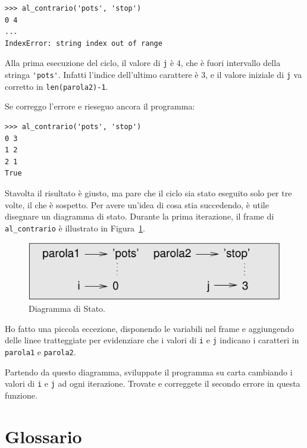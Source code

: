 \documentclass[10pt]{book}
\begin{document}
\begin{verbatim}
>>> al_contrario('pots', 'stop')
0 4
...
IndexError: string index out of range
\end{verbatim}
%
Alla prima esecuzione del ciclo, il valore di {\tt j} è 4,
che è fuori intervallo della stringa \verb"'pots'".
Infatti l'indice dell'ultimo carattere è 3, e il valore iniziale di {\tt j} va corretto in {\tt len(parola2)-1}.

Se correggo l'errore e rieseguo ancora il programma:

\begin{verbatim}
>>> al_contrario('pots', 'stop')
0 3
1 2
2 1
True
\end{verbatim}
%
Stavolta il risultato è giusto, ma pare che il ciclo sia stato eseguito solo per tre volte, il che è sospetto. Per avere un'idea di cosa stia succedendo, è utile disegnare un diagramma di stato. Durante la prima iterazione, il frame di \verb"al_contrario" è illustrato in Figura~\ref{fig.state4}.

\begin{figure}
\centerline
{\includegraphics[scale=0.8]{figs/state4.pdf}}
\caption{Diagramma di Stato.}
\label{fig.state4}
\end{figure}


Ho fatto una piccola eccezione, disponendo le variabili nel frame e aggiungendo delle linee tratteggiate per evidenziare che i valori di {\tt i} e
{\tt j} indicano i caratteri in {\tt parola1} e {\tt parola2}.

\vspace{0.2in}
\begin{exercise}
\label{isreverse}

Partendo da questo diagramma, sviluppate il programma su carta cambiando i valori di {\tt i} e {\tt j} ad ogni iterazione. Trovate e correggete il secondo errore in questa funzione.

\end{exercise}



\section{Glossario}
\end{document}
